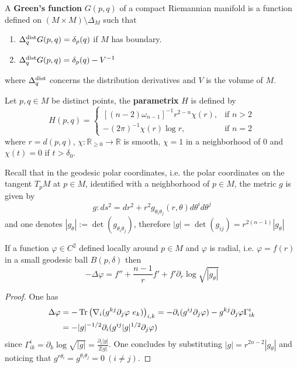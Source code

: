 \begin{definition}
A \textbf{Green's function} \(G(p,q)\) of a compact Riemannian manifold is a function defined on
\((M\times M)\setminus \Delta_M\) such that
\begin{enumerate}
\item \(\Delta_q^{\rm dist}G(p,q) = \delta_p(q)\) if \(M\) has boundary.
\item \(\Delta_q^{\rm dist}G(p,q) = \delta_p(q) - V^{-1}\)
\end{enumerate}
where \(\Delta_q^{\rm dist}\) concerns the distribution derivatives and \(V\) is the
volume of \(M\).

Let \(p,q\in M\) be distinct points, the \textbf{parametrix} \(H\) is defined by
\[
 H(p,q) = \begin{cases}
 [(n-2)\omega_{n-1}]^{-1} r^{2-n}\chi(r),  & \text{if $n>2$} \\
 -(2\pi)^{-1} \chi(r)\log r, & \text{if $n=2$}
\end{cases}
\]
where \(r=d(p,q)\), \(\chi: \mathbb{R}_{\geq 0} \longrightarrow \mathbb{R}\) is smooth, \(\chi=1\)
in a neighborhood of \(0\) and \(\chi(t)=0\) if \(t >\delta_0\).
\end{definition}


Recall that in the geodesic polar coordinates, i.e. the polar coordinates on the tangent \(T_pM\) at \(p\in  M\), identified with a neighborhood of \(p\in M\), the metric \(g\) is given by
\[
g: ds^2 = dr^2 + r^2 g_{\theta_i\theta_j}(r,\theta) d\theta^i d\theta^j
\]
and one denotes \(| g_\theta |:= \det (g_{\theta_i \theta_j})\), therefore
\(|g|=\det(g_{ij}) = r^{2(n-1)}|g_\theta|\)

\begin{lemma}
\label{lem:lap-radial}
If a function \(\varphi \in C^2\) defined locally around \(p\in M\) and \(\varphi\)
is radial, i.e. \(\varphi = f(r)\) in a small geodesic ball \(B(p, \delta)\) then
\[
-\Delta \varphi = f'' + \frac{n-1}{r} f' + f' \partial_r \log \sqrt{|g_\theta|}
\]
\end{lemma}
\begin{proof}
One has
\begin{equation*}
\begin{split}
\Delta \varphi &= - \tr\left(\nabla_i(g^{kj} \partial_j \varphi\ e_k)\right)_{i,k} = -\partial_i (g^{ij} \partial_j\varphi) - g^{kj} \partial_j \varphi \Gamma^i_{ik}\\
       	       &= -|g|^{-1/2} \partial_i (g^{ij} |g|^{1/2} \partial_j \varphi)
\end{split}   
\end{equation*}
since \(\Gamma^{i}_{ik} = \partial_k \log \sqrt{|g|} = \frac{\partial_i |g|}{2|g|}\). One concludes by substituting \(|g| = r^{2n-2}|g_\theta|\) and noticing that \(g^{r\theta_i} = g^{\theta_i\theta_j} = 0\ (i\ne j)\).
\end{proof}

